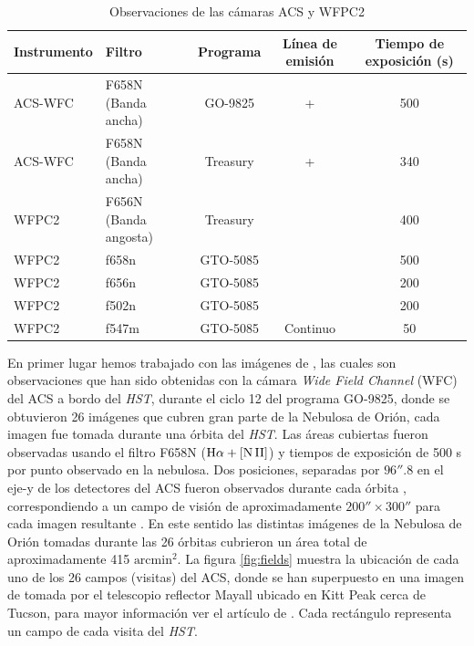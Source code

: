 \begin{table}
  \centering
  \small\raggedright
\renewcommand{\arraystretch}{1.5}
  \caption{Observaciones de las cámaras ACS y WFPC2}\label{tab:instru}
  \begin{tabular}{l l c c c}
   \hline
   \hline
   Instrumento&      Filtro&      Programa&      Línea de emisión&     Tiempo de exposición (s)\\ \hline
   ACS-WFC&          F658N (Banda ancha)&       GO-9825&       \ha{} + \nii{}&       500\\ 
   ACS-WFC&          F658N (Banda ancha)&        Treasury&   \ha{} + \nii{}&        340\\ 
   WFPC2&            F656N (Banda angosta)&      Treasury&   \ha{}&      400\\
   WFPC2&            f658n&       GTO-5085&      \nii{}&               500\\
   WFPC2&            f656n&       GTO-5085&      \ha{}&                200\\
   WFPC2&            f502n&       GTO-5085&      \oiii{}&              200\\
   WFPC2&            f547m&       GTO-5085&      Continuo&             50\\ 
  \hline
  \end{tabular}
\end{table}
\normalsize

En primer lugar  hemos trabajado con las imágenes de \citet{Bally:2006a}, las cuales son observaciones que han sido obtenidas con la cámara \textit{Wide Field Channel} (WFC) del ACS a bordo del \textit{HST}, durante el ciclo 12 del programa GO-9825, donde se obtuvieron 26 imágenes que cubren gran parte de la Nebulosa de Orión, cada imagen fue tomada durante una órbita del \textit{HST}. Las áreas cubiertas fueron observadas usando el filtro F658N (\(\mathrm{H}\alpha+\mathrm{[N\,II]}\)) y tiempos de exposición de 500 s por punto observado en la nebulosa. Dos posiciones, separadas por \(96''.8\) en el eje-y de los detectores del ACS fueron observados durante cada órbita \citep{Bally:2006a}, correspondiendo a un campo de visión de aproximadamente \(200'' \times 300'' \) para cada imagen resultante \citep{Bally:2006a}. En este sentido las distintas imágenes de la Nebulosa de Orión tomadas durante las 26 órbitas cubrieron un área total de aproximadamente 415 \(\text{arcmin}^{2}\). La figura \ref{fig:fields} muestra la ubicación de cada uno de los 26 campos (visitas) del ACS, donde se han superpuesto en una imagen de \sii{} tomada por el telescopio reflector Mayall ubicado en Kitt Peak cerca de Tucson, para mayor información ver el artículo de \citet{Bally:2001a}. Cada rectángulo representa un campo de cada visita del \textit{HST}.\\

